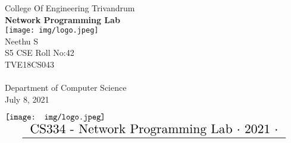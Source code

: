 \documentclass{article}
\begin{document}


\begin{titlepage}



\begin{center}
{\LARGE College Of Engineering Trivandrum}\\[3cm]
\linespread{1.2}\huge {\bfseries Network Programming Lab}\\[3cm]
\linespread{1}
\texttt{[image: img/logo.jpeg]}\\[3cm]
{\Large Neethu S\\ S5  CSE Roll No:42\\ TVE18CS043 }\\[1cm]
\textit{ }\\[2cm]
Department of Computer Science\\[0.2cm]
\Large{July 8, 2021}
\end{center}

\end{titlepage}

\newpage

\begin{frame}
    \centering
    \hspace*{-0.5cm}
    $\vcenter{\hbox{\texttt{[image: img/logo.jpeg]}}}$
    $\vcenter{\resizebox{0.95\textwidth}{!}{
        \begin{tabular}{c}
             CS334 - Network Programming Lab $\cdot$ 2021 $\cdot$   \\
             \hline 
             
        \end{tabular}
    }}$
\end{frame}

\end{document}
